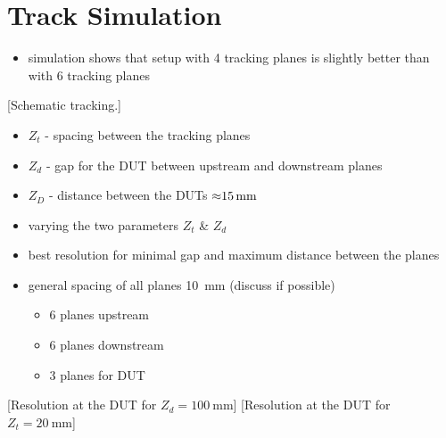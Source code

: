 \newpage
\section{Track Simulation}
\begin{itemize}
	\item simulation shows that setup with 4 tracking planes is slightly better than with 6 tracking planes
\end{itemize}

[Schematic tracking.]

\begin{itemize}
	\item $Z_t$ - spacing between the tracking planes
	\item $Z_d$ - gap for the \ac{DUT} between upstream and downstream planes
	\item $Z_D$ - distance between the \acp{DUT} $\SI{\approx15}{\mm}$
\end{itemize}\vspace*{2ex}

\begin{itemize}
	\item varying the two parameters $Z_t$ \& $Z_d$
	\item best resolution for minimal gap and maximum distance between the planes
	\item \ra general spacing of all planes \SI{10}{\mm} (\ra discuss if possible)
	\begin{itemize}
		\item 6 planes upstream
		\item 6 planes downstream
		\item 3 planes for DUT
	\end{itemize}

\end{itemize}

[Resolution at the \ac{DUT} for $Z_d = \SI{100}{\mm}$]
[Resolution at the \ac{DUT} for $Z_t = \SI{20}{\mm}$]






